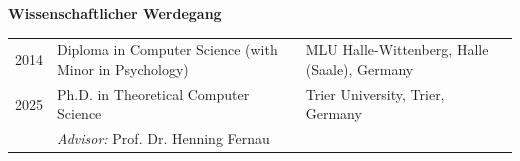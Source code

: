 \begin{center} 
	\textbf{Wissenschaftlicher Werdegang} 
\end{center} 

\begin{tabular}{lp{8cm}p{6cm}}
	2014 & Diploma in Computer Science (with Minor in Psychology) & MLU Halle-Wittenberg, Halle (Saale), Germany \\
	2025 & Ph.D. in Theoretical Computer Science                  & Trier University, Trier, Germany \\
	& \emph{Advisor:} Prof. Dr. Henning Fernau                    &
\end{tabular}
%
%
